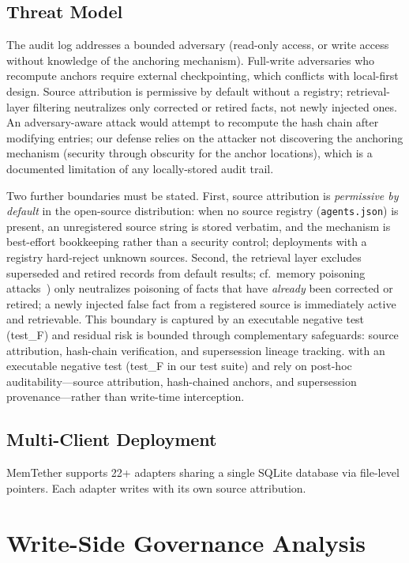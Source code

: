 \documentclass[sigconf,nonacm]{acmart}
\begin{document}
\subsection{Threat Model}
\label{sec:threat}
The audit log addresses a bounded adversary (read-only access, or write access without knowledge of the anchoring mechanism). Full-write adversaries who recompute anchors require external checkpointing, which conflicts with local-first design. Source attribution is permissive by default without a registry; retrieval-layer filtering neutralizes only corrected or retired facts, not newly injected ones. An adversary-aware attack would attempt to recompute the hash chain after modifying entries; our defense relies on the attacker not discovering the anchoring mechanism (security through obscurity for the anchor locations), which is a documented limitation of any locally-stored audit trail.

Two further boundaries must be stated. First, source attribution is \emph{permissive by default} in the open-source distribution: when no source registry (\texttt{agents.json}) is present, an unregistered source string is stored verbatim, and the mechanism is best-effort bookkeeping rather than a security control; deployments with a registry hard-reject unknown sources. Second, the retrieval layer excludes superseded and retired records from default results; cf.\ memory poisoning attacks~\citep{sleeper,agentpoison}) only neutralizes poisoning of facts that have \emph{already} been corrected or retired; a newly injected false fact from a registered source is immediately active and retrievable. This boundary is captured by an executable negative test (test\_F) and residual risk is bounded through complementary safeguards: source attribution, hash-chain verification, and supersession lineage tracking. with an executable negative test (test\_F in our test suite) and rely on post-hoc auditability---source attribution, hash-chained anchors, and supersession provenance---rather than write-time interception.

\subsection{Multi-Client Deployment}
MemTether supports 22+ adapters sharing a single SQLite database via file-level pointers. Each adapter writes with its own source attribution.

\section{Write-Side Governance Analysis}
\label{sec:governance}
\end{document}
